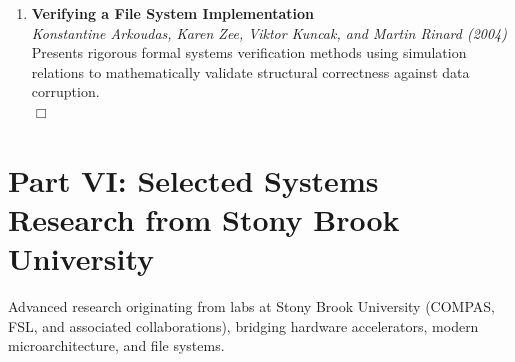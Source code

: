 \documentclass[11pt,a4paper]{article}
\begin{document}
\begin{enumerate}[resume]
    \item \textbf{Verifying a File System Implementation} \\
    \textit{Konstantine Arkoudas, Karen Zee, Viktor Kuncak, and Martin Rinard (2004)} \\
    Presents rigorous formal systems verification methods using simulation relations to mathematically validate structural correctness against data corruption. \\
    $\Box$
\end{enumerate}

\section{Part VI: Selected Systems Research from Stony Brook University}
Advanced research originating from labs at Stony Brook University (COMPAS, FSL, and associated collaborations), bridging hardware accelerators, modern microarchitecture, and file systems.
\end{document}
